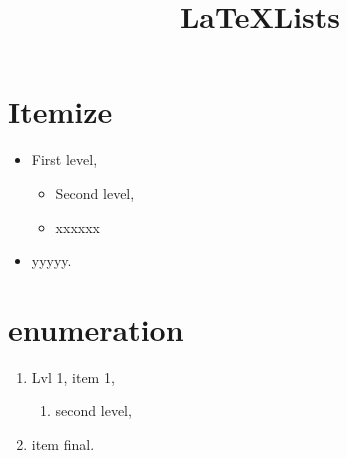 \documentclass[twocolumn]{article}
\title{\LaTeX Lists}
\begin{document}
\maketitle

\section {Itemize}
\begin{itemize}
  \item First level,
    \begin{itemize}
      \item Second level,
      \item xxxxxx
    \end{itemize}
  \item yyyyy.
\end{itemize}

\section{enumeration}

\begin{enumerate}
  \item Lvl 1, item 1,
    \begin{enumerate}
      \item second level,
    \end{enumerate}
  \item item final.
\end{enumerate}
\end{document}
